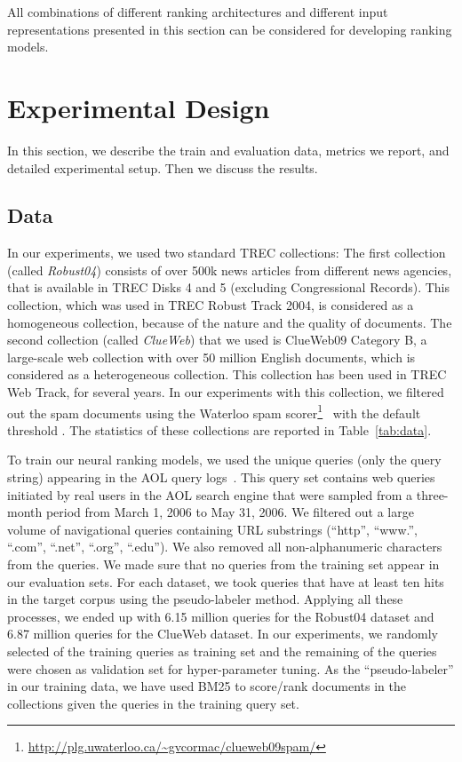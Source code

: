 \documentclass[sigconf]{acmart}
\newcommand{\sshrink}{\vspace{-.80ex}}
\begin{document}
\medskip
All combinations of different ranking architectures and different input representations presented in this section can be considered for developing ranking models.

\sshrink
\section{Experimental Design}
In this section, we describe the train and evaluation data, metrics we report, and detailed experimental setup. Then we discuss the results.


\sshrink
\subsection{Data}
\label{sec:data}
In our experiments, we used two standard TREC collections: The first collection (called \emph{Robust04}) consists of over 500k news articles from different news agencies, that is available in TREC Disks 4 and 5 (excluding Congressional Records). This collection, which was used in TREC Robust Track 2004, is considered as a homogeneous collection, because of the nature and the quality of documents. The second collection (called \emph{ClueWeb}) that we used is ClueWeb09 Category B, a large-scale web collection with over 50 million English documents, which is considered as a heterogeneous collection. This collection has been used in TREC Web Track, for several years. In our experiments with this collection, we filtered out the spam documents using the Waterloo spam scorer\footnote{\url{http://plg.uwaterloo.ca/~gvcormac/clueweb09spam/}}~\citep{Cormack:2011} with the default threshold . The statistics of these collections are reported in Table~\ref{tab:data}. 

To train our neural ranking models, we used the unique queries (only the query string) appearing in the AOL query logs~\citep{Pass:2006}. This query set contains web queries initiated by real users in the AOL search engine that were sampled from a three-month period from March 1, 2006 to May 31, 2006. We filtered out a large volume of navigational queries containing URL substrings (``http'', ``www.'', ``.com'', ``.net'', ``.org'', ``.edu''). We also removed all non-alphanumeric characters from the queries. We made sure that no queries from the training set appear in our evaluation sets. For each dataset, we took queries that have at least ten hits in the target corpus using the pseudo-labeler method. Applying all these processes, we ended up with 6.15 million queries for the Robust04 dataset and 6.87 million queries for the ClueWeb dataset. 
In our experiments, we randomly selected  of the training queries as training set and the remaining  of the queries were chosen as validation set for hyper-parameter tuning. As the ``pseudo-labeler'' in our training data, we have used BM25 to score/rank documents in the collections given the queries in the training query set.
\end{document}
